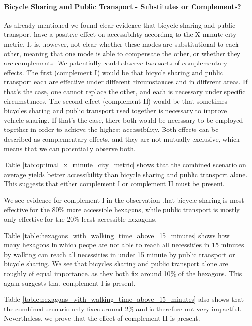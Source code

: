 \paragraph{Bicycle Sharing and Public Transport - Substitutes or Complements?}
As already mentioned we found clear evidence that bicycle sharing and public transport have a positive effect on accessibility according to the X-minute city metric.
It is, however, not clear whether these modes are substitutional to each other, meaning that one mode is able to compensate the other, or whether they are complements.
We potentially could observe two sorts of complementary effects.
The first (complement I) would be that bicycle sharing and public transport each are effective under different circumstances and in different areas.
If that's the case, one cannot replace the other, and each is necessary under specific circumstances.
The second effect (complement II) would be that sometimes bicycles sharing and public transport used together is necessary to improve vehicle sharing.
If that's the case, there both would be necessary to be employed together in order to achieve the highest accessibility.
Both effects can be described as complementary effects, and they are not mutually exclusive, which means that we can potentially observe both.


Table \ref{tab:optimal_x_minute_city_metric} shows that the combined scenario on average yields better accessibility than bicycle sharing and public transport alone.
This suggests that either complement I or complement II must be present.

We see evidence for complement I in the observation that bicycle sharing is most effective for the 80\% more accessible hexagons, while public transport is mostly only effective for the 20\% least accessible hexagons.

Table \ref{table:hexagons_with_walking_time_above_15_minutes} shows how many hexagons in which peope are not able to reach all necessities in 15 minutes by walking can reach all necessities in under 15 minute by public transport or bicycle sharing.
We see that bicycles sharing and public transport alone are roughly of equal importance, as they both fix around 10\% of the hexagons.
This again suggests that complement I is present.


Table \ref{table:hexagons_with_walking_time_above_15_minutes} also shows that the combined scenario only fixes around 2\% and is therefore not very impactful.
Nevertheless, we prove that the effect of complement II is present.


